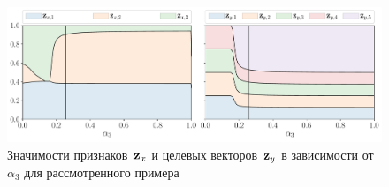 \begin{figure}
	\centering
	\includegraphics[width=\linewidth]{figs/ch2/features_vs_alpha.pdf}
	\caption{Значимости признаков~$\mathbf{z}_x$ и целевых векторов~$\mathbf{z}_y$ в зависимости от~$\alpha_3$ для рассмотренного примера}
	\label{ch2:fig:features_vs_alpha}
\end{figure}


